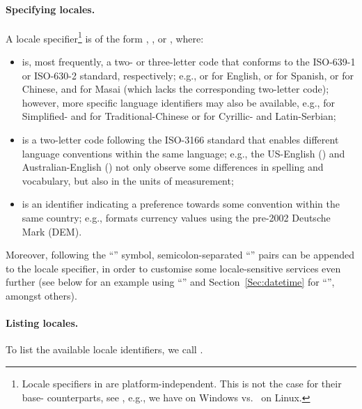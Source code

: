 \documentclass[nojss]{jss}\usepackage[]{graphicx}\usepackage[]{color}
\newcommand{\strq}[1]{\code{{"{}#1"{}}}}
\begin{document}
\paragraph{Specifying locales.}
A locale specifier\footnote{%
Locale specifiers in  are platform-independent.
This is not the case for their base- counterparts, see
, e.g., we have \strq{Polish\_Poland} on Windows
vs.~\strq{pl\_PL} on Linux.}
is of the form
, , or ,
where:
\begin{itemize}
\item
{} is, most frequently, a two- or three-letter code that conforms to
the ISO-639-1 or ISO-630-2 standard, respectively;
e.g.,  or  for English,  or 
for Spanish,  or  for Chinese, and  for Masai
(which lacks the corresponding two-letter code);
however, more specific language identifiers may also be
available, e.g.,  for Simplified-
and  for Traditional-Chinese
or  for Cyrillic- and  Latin-Serbian;


\item
{} is a two-letter code following the ISO-3166 standard
that enables different language conventions within the same language;
e.g., the US-English () and Australian-English ()
not only observe some differences in spelling and vocabulary, but also
in the units of measurement;

\item
{} is an identifier indicating a preference towards
some convention within the same country; e.g., 
formats currency values using the pre-2002 Deutsche Mark (DEM).
\end{itemize}
Moreover,  following the
``'' symbol, semicolon-separated ``'' pairs
can be appended to the locale specifier, in order to
customise some locale-sensitive services even further
(see below for an example using ``''
and Section~\ref{Sec:datetime} for ``'', amongst others).


{\color{red}

}
%
%





\paragraph{Listing locales.}
To list the available locale identifiers, we call .
\end{document}
